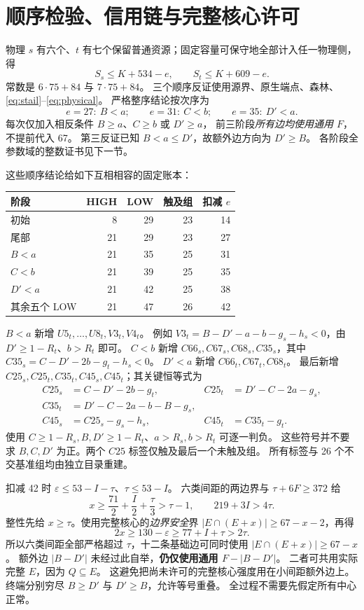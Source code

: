 \documentclass[11pt,a4paper]{article}
\begin{document}
\section{顺序检验、信用链与完整核心许可}
物理 $s$ 有六个、$t$ 有七个保留普通资源；固定容量可保守地全部计入任一物理侧，得
\begin{equation}
 S_s\le K+534-e,\qquad S_t\le K+609-e.\label{eq:physical}
\end{equation}
常数是 $6\cdot75+84$ 与 $7\cdot75+84$。
三个顺序反证使用源界、原生端点、森林、\eqref{eq:stail}--\eqref{eq:physical}。
严格整序结论按次序为
\[
 e=27:\ B<a;\qquad e=31:\ C<b;\qquad e=35:\ D'<a.
\]
每次仅加入相反条件 $B\ge a$、$C\ge b$ 或 $D'\ge a$，
前三阶段\emph{所有边均使用通用 $F$}，不提前代入 67。
第三反证已知 $B<a\le D'$，故额外边方向为 $D'\ge B$。
各阶段全参数域的整数证书见下一节。

这些顺序结论给如下互相相容的固定账本：
\begin{center}
\begin{tabular}{lrrrr}\toprule
阶段 & HIGH & LOW & 触及组 & 扣减 $e$\\\midrule
初始 &8&29&23&14\\
尾部 &21&29&23&27\\
$B<a$ &21&35&25&31\\
$C<b$ &21&39&25&35\\
$D'<a$ &21&42&25&38\\
其余五个 LOW &21&47&26&42\\\bottomrule
\end{tabular}
\end{center}
$B<a$ 新增 $U5_t,\ldots,U8_t,V3_t,V4_t$。
例如 $V3_t=B-D'-a-b-g_s-h_s<0$，由 $D'\ge1-R_t$、$b>R_t$ 即可。
$C<b$ 新增 $C66_s,C67_s,C68_s,C35_s$，其中
$C35_s=C-D'-2b-g_t-h_s<0$。
$D'<a$ 新增 $C66_t,C67_t,C68_t$。
最后新增 $C25_s,C25_t,C35_t,C45_s,C45_t$；其关键恒等式为
\begin{align*}
 C25_s&=C-D'-2b-g_t,&C25_t&=D'-C-2a-g_s,\\
 C35_t&=D'-C-2a-b-B-g_s,\\
 C45_s&=C25_s-g_s-h_s,&C45_t&=C35_t-g_t.
\end{align*}
使用 $C\ge1-R_s,B,D'\ge1-R_t$、$a>R_s,b>R_t$ 可逐一判负。
这些符号并不要求 $B,C,D'$ 为正。两个 $C25$ 标签仅触及最后一个未触及组。
所有标签与 26 个不交基准组均由独立目录重建。

扣减 42 时 $\varepsilon\le53-I-\tau$、$\tau\le53-I$。
六类间距的两边界与 $\tau+6F\ge372$ 给
\[
 x\ge\frac{71}{2}+\frac I2+\frac\tau3>\tau-1,
 \qquad 219+3I>4\tau.
\]
整性先给 $x\ge\tau$。使用完整核心的\emph{边界安全}界
$|E\cap(E+x)|\ge67-x-2$，再得
\[
 2x\ge130-\varepsilon\ge77+I+\tau>2\tau.
\]
所以六类间距全部严格超过 $\tau$，十二条基础边可同时使用
$|E\cap(E+x)|\ge67-x$。
额外边 $|B-D'|$ 未经过此自举，\textbf{仍仅使用通用 $F-|B-D'|$}。
二者可共用实际完整 $E$，因为 $Q\subseteq E$。
这避免把尚未许可的完整核心强度用在小间距额外边上。
终端分别穷尽 $B\ge D'$ 与 $D'\ge B$，允许等号重叠。
全过程不需要先假定所有中心正常。
\end{document}
